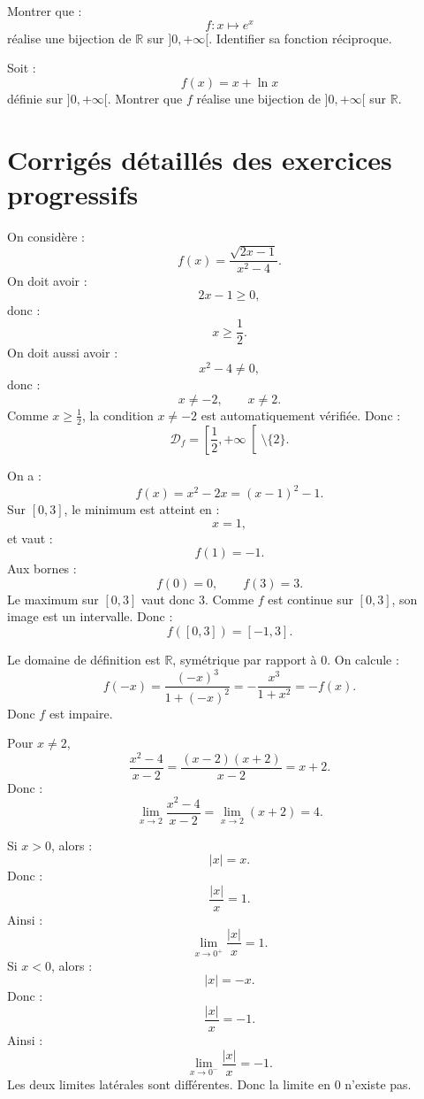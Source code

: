 \documentclass[11pt,a4paper]{article}
\newcommand{\R}{\mathbb R}
\newcommand{\Df}{\mathcal D_f}
\begin{document}
\begin{exercicebox}[11]
Montrer que :
\[
f:x\mapsto e^x
\]
réalise une bijection de \(\R\) sur \(]0,+\infty[\).  
Identifier sa fonction réciproque.
\end{exercicebox}

\begin{exercicebox}[12]
Soit :
\[
f(x)=x+\ln x
\]
définie sur \(]0,+\infty[\).  
Montrer que \(f\) réalise une bijection de \(]0,+\infty[\) sur \(\R\).
\end{exercicebox}

\newpage
\section{Corrigés détaillés des exercices progressifs}

\begin{correctionbox}[1]
On considère :
\[
f(x)=\frac{\sqrt{2x-1}}{x^2-4}.
\]
On doit avoir :
\[
2x-1\geq0,
\]
donc :
\[
x\geq\frac12.
\]
On doit aussi avoir :
\[
x^2-4\neq0,
\]
donc :
\[
x\neq -2,\qquad x\neq2.
\]
Comme \(x\geq\frac12\), la condition \(x\neq -2\) est automatiquement vérifiée.  
Donc :
\[
\Df=\left[\frac12,+\infty\right[\setminus\{2\}.
\]
\end{correctionbox}

\begin{correctionbox}[2]
On a :
\[
f(x)=x^2-2x=(x-1)^2-1.
\]
Sur \([0,3]\), le minimum est atteint en :
\[
x=1,
\]
et vaut :
\[
f(1)=-1.
\]
Aux bornes :
\[
f(0)=0,
\qquad
f(3)=3.
\]
Le maximum sur \([0,3]\) vaut donc \(3\).  
Comme \(f\) est continue sur \([0,3]\), son image est un intervalle.  
Donc :
\[
f([0,3])=[-1,3].
\]
\end{correctionbox}

\begin{correctionbox}[3]
Le domaine de définition est \(\R\), symétrique par rapport à \(0\).  
On calcule :
\[
f(-x)=\frac{(-x)^3}{1+(-x)^2}
=
-\frac{x^3}{1+x^2}
=
-f(x).
\]
Donc \(f\) est impaire.
\end{correctionbox}

\begin{correctionbox}[4]
Pour \(x\neq2\),
\[
\frac{x^2-4}{x-2}
=
\frac{(x-2)(x+2)}{x-2}
=
x+2.
\]
Donc :
\[
\lim_{x\to2}\frac{x^2-4}{x-2}
=
\lim_{x\to2}(x+2)
=
4.
\]
\end{correctionbox}

\begin{correctionbox}[5]
Si \(x>0\), alors :
\[
|x|=x.
\]
Donc :
\[
\frac{|x|}{x}=1.
\]
Ainsi :
\[
\lim_{x\to0^+}\frac{|x|}{x}=1.
\]
Si \(x<0\), alors :
\[
|x|=-x.
\]
Donc :
\[
\frac{|x|}{x}=-1.
\]
Ainsi :
\[
\lim_{x\to0^-}\frac{|x|}{x}=-1.
\]
Les deux limites latérales sont différentes.  
Donc la limite en \(0\) n'existe pas.
\end{correctionbox}
\end{document}

